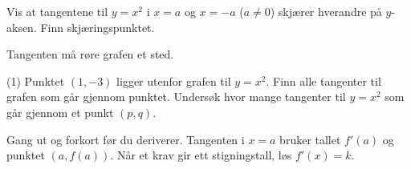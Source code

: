 Vis at tangentene til $y = x^2$ i $x = a$ og $x = -a$ ($a \neq 0$) skjærer hverandre på $y$-aksen.
Finn skjæringspunktet.

Tangenten må røre grafen et sted.
\begin{tasks}(1)
  \task Punktet $(1, -3)$ ligger utenfor grafen til $y = x^2$. Finn alle tangenter til grafen som går gjennom punktet.
  \task Undersøk hvor mange tangenter til $y = x^2$ som går gjennom et punkt $(p, q)$.
\end{tasks}

\begin{oppsummering}
Gang ut og forkort før du deriverer. Tangenten i $x = a$ bruker tallet $f'(a)$ og punktet $(a, f(a))$.
Når et krav gir ett stigningstall, løs $f'(x) = k$.
\end{oppsummering}
